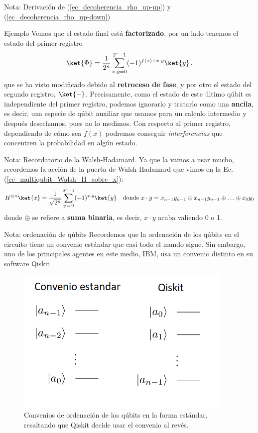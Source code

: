 \documentclass[a4paper,11pt]{book} %
\numberwithin{equation}{chapter}
\begin{document}
\begin{mybox_blue}{Nota: Derivación de (\ref{ec_decoherencia_rho_up-up}) y  (\ref{ec_decoherencia_rho_up-down})}
\begin{mybox_green}{Ejemplo}
	Vemos que el estado final está \textbf{factorizado}, por un lado tenemos el estado del primer registro
		\begin{equation} \label{ec_algoritmos_Psi}
		\ket{\Phi} =  \frac{1}{2^n} \sum_{x,y=0}^{2^n-1}(-1)^{f(x)+ x \cdot y}\ket{y} \, .
		\end{equation}
	que se ha visto modificado debido al \textbf{retroceso de fase}, y por otro el estado del segundo registro, $\ket{-}$. Precisamente, como el estado de este último qúbit es independiente
	del primer registro, podemos ignorarlo y tratarlo como una \textbf{ancila}, es decir, una especie de qúbit auxiliar que 
	usamos para un calculo intermedio y después desechamos, pues no lo medimos. Con respecto al primer registro, dependiendo 
	de cómo sea $f(x)$ podremos conseguir \textit{interferencias} que  concentren la probabilidad en algún estado. 
	
	\end{mybox_green}

	\begin{mybox_blue}{Nota: Recordatorio de la Walsh-Hadamard.}
	Ya que la vamos a usar mucho, recordemos la acción de la puerta de Walsh-Hadamard que vimos en la Ec. (\ref{ec_multiqubit_Walsh_H_sobre_x}):	
	\begin{equation} \label{ec_algoritmos_Walsh_H_sobre_x}
	H^{\otimes n} \ket{x} = \frac{1}{\sqrt{2^n}} \sum_{y \, =\, 0}^{2^n-1}(-1)^{x\cdot y} \ket{y} ~~ \text{ donde } x\cdot y = x_{n-1} y_{n-1} \oplus x_{n-1} y_{n-1} \oplus \ldots \oplus x_0 y_0
	\end{equation} 	
	donde $\oplus$ se refiere a \textbf{suma binaria}, es decir, $x \cdot y$ acaba valiendo 0 o 1.
	\end{mybox_blue}

	\begin{mybox_blue}{Nota: ordenación de qúbits}
	Recordemos que la ordenación de los qúbits en el circuito tiene un convenio estándar que casi todo el mundo sigue. Sin embargo,
	uno de los principales agentes en este medio, IBM, usa un convenio distinto en su software Qiskit
	\begin{figure}[H]
	\centering 
	\includegraphics[width=0.4\linewidth]{Figuras/Fig_multiqubits_convenios_ordenacion}
	\caption{Convenios de ordenación de los qúbits en la forma estándar, resaltando que Qiskit decide usar el convenio al revés.}
	\label{Fig_elementos_convenios_ordenacion}
	\end{figure}
	\end{mybox_blue}
	




\end{mybox_blue}
\end{document}
